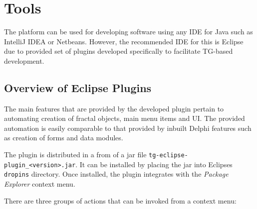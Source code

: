 \chapter{Tools}\label{ch02:00}


  The platform can be used for developing software using any IDE for Java such as IntelliJ IDEA or Netbeans.
  However, the recommended IDE for this is Eclipse due to provided set of plugins developed specifically to facilitate TG-based development.
  
\section{Overview of Eclipse Plugins}

  The main features that are provided by the developed plugin pertain to automating creation of fractal objects, main menu items and UI.
  The provided automation is easily comparable to that provided by inbuilt Delphi features such as creation of forms and data modules.
  
  The plugin is distributed in a from of a jar file \texttt{tg-eclipse-plugin\_\textless version\textgreater.jar}.
  It can be installed by placing the jar into Eclipses \texttt{dropins} directory.
  Once installed, the plugin integrates with the \emph{Package Explorer} context menu.
  
  There are three groups of actions that can be invoked from a context menu:
  
